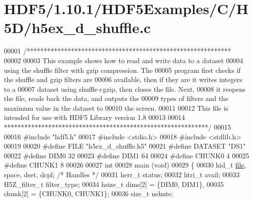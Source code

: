 \hypertarget{_h_d_f5_21_810_81_2_h_d_f5_examples_2_c_2_h5_d_2h5ex__d__shuffle_8c_source}{}\section{H\+D\+F5/1.10.1/\+H\+D\+F5\+Examples/\+C/\+H5\+D/h5ex\+\_\+d\+\_\+shuffle.c}
\label{_h_d_f5_21_810_81_2_h_d_f5_examples_2_c_2_h5_d_2h5ex__d__shuffle_8c_source}

\begin{DoxyCode}
00001 \textcolor{comment}{/************************************************************}
00002 \textcolor{comment}{}
00003 \textcolor{comment}{  This example shows how to read and write data to a dataset}
00004 \textcolor{comment}{  using the shuffle filter with gzip compression.  The}
00005 \textcolor{comment}{  program first checks if the shuffle and gzip filters are}
00006 \textcolor{comment}{  available, then if they are it writes integers to a}
00007 \textcolor{comment}{  dataset using shuffle+gzip, then closes the file.  Next,}
00008 \textcolor{comment}{  it reopens the file, reads back the data, and outputs the}
00009 \textcolor{comment}{  types of filters and the maximum value in the dataset to}
00010 \textcolor{comment}{  the screen.}
00011 \textcolor{comment}{}
00012 \textcolor{comment}{  This file is intended for use with HDF5 Library version 1.8}
00013 \textcolor{comment}{}
00014 \textcolor{comment}{ ************************************************************/}
00015 
00016 \textcolor{preprocessor}{#include "hdf5.h"}
00017 \textcolor{preprocessor}{#include <stdio.h>}
00018 \textcolor{preprocessor}{#include <stdlib.h>}
00019 
00020 \textcolor{preprocessor}{#define FILE            "h5ex\_d\_shuffle.h5"}
00021 \textcolor{preprocessor}{#define DATASET         "DS1"}
00022 \textcolor{preprocessor}{#define DIM0            32}
00023 \textcolor{preprocessor}{#define DIM1            64}
00024 \textcolor{preprocessor}{#define CHUNK0          4}
00025 \textcolor{preprocessor}{#define CHUNK1          8}
00026 
00027 \textcolor{keywordtype}{int}
00028 main (\textcolor{keywordtype}{void})
00029 \{
00030     hid\_t           \hyperlink{structfile}{file}, space, dset, dcpl;    \textcolor{comment}{/* Handles */}
00031     herr\_t          status;
00032     htri\_t          avail;
00033     H5Z\_filter\_t    filter\_type;
00034     hsize\_t         dims[2] = \{DIM0, DIM1\},
00035                     chunk[2] = \{CHUNK0, CHUNK1\};
00036     \textcolor{keywordtype}{size\_t}          nelmts;

\end{DoxyCode}

